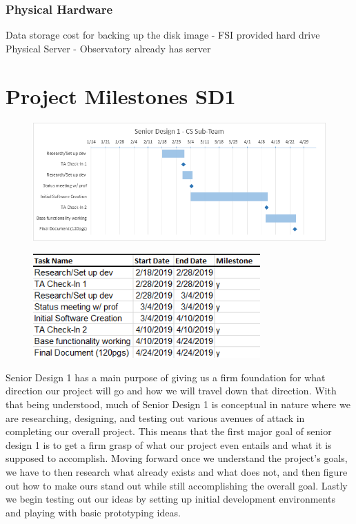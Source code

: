 \documentclass[12pt]{report}
\begin{document}
\subsubsection*{Physical Hardware}

Data storage cost for backing up the disk image - FSI provided hard drive\\
Physical Server - Observatory already has server

\newpage

\section*{Project Milestones SD1}

\begin{figure}[h]
	\centering
	\includegraphics[width=\linewidth]{SD1Gantt}
\end{figure}

\begin{figure}[h]
	\centering
	\includegraphics[width=0.6\linewidth, height=4.0cm]{SD1Dates}
\end{figure}

Senior Design 1 has a main purpose of giving us a firm foundation for what direction our project will go and how we will travel down that direction. With that being understood, much of Senior Design 1 is conceptual in nature where we are researching, designing, and testing out various avenues of attack in completing our overall project. This means that the first major goal of senior design 1 is to get a firm grasp of what our project even entails and what it is supposed to accomplish. Moving forward once we understand the project's goals, we have to then research what already exists and what does not, and then figure out how to make ours stand out while still accomplishing the overall goal. Lastly we begin testing out our ideas by setting up initial development environments and playing with basic prototyping ideas. 
\end{document}
